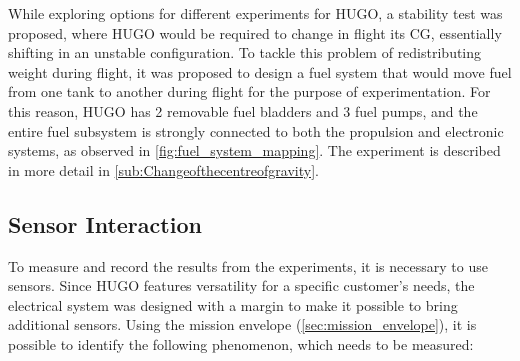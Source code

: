 While exploring options for different experiments for HUGO, a stability test was proposed, where HUGO would be required to change in flight its CG, essentially shifting in an unstable configuration. To tackle this problem of redistributing weight during flight, it was proposed to design a fuel system that would move fuel from one tank to another during flight for the purpose of experimentation. For this reason, HUGO has 2 removable fuel bladders and 3 fuel pumps, and the entire fuel subsystem is strongly connected to both the propulsion and electronic systems, as observed in \autoref{fig:fuel_system_mapping}. The experiment is described in more detail in \autoref{sub:Changeofthecentreofgravity}.


\subsection{Sensor Interaction}
\label{sub:sensorinteraction}
To measure and record the results from the experiments, it is necessary to use sensors. Since HUGO features versatility for a specific customer's needs, the electrical system was designed with a margin to make it possible to bring additional sensors.       
Using the mission envelope  (\autoref{sec:mission_envelope}), it is possible to identify the following phenomenon, which needs to be measured: 
